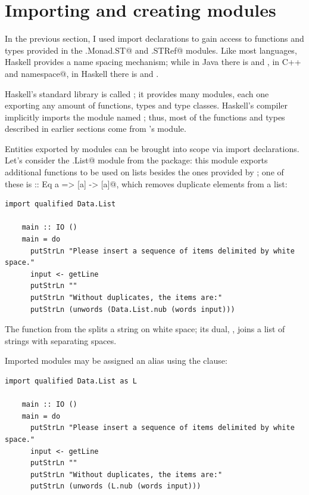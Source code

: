 \documentclass[UdineBachThesis,american,11pt]{PhdThesis}
\begin{document}
  \section{Importing and creating modules}

  In the previous section, I used import declarations to gain access to
  functions and types provided in the \lstinline@Control.Monad.ST@ and
  \lstinline@Data.STRef@ modules. Like most languages, Haskell provides a name
  spacing mechanism; while in Java there is \lstinline@package@ and
  \lstinline@import@, in C++ \lstinline@namespace@ and
  \lstinline@using namespace@, in Haskell there is \lstinline@module@ and
  \lstinline@import@.

  Haskell's standard library is called \lstinline@base@; it provides many
  modules, each one exporting any amount of functions, types and type classes.
  Haskell's compiler implicitly imports the module named \lstinline@Prelude@;
  thus, most of the functions and types described in earlier sections come from
  \lstinline@base@'s \lstinline@Prelude@ module.

  Entities exported by modules can be brought into scope via import
  declarations. Let's consider the \lstinline@Data.List@ module from the
  \lstinline@base@ package: this module exports additional functions to be used
  on lists besides the ones provided by \lstinline@Prelude@; one of these is
  \lstinline@nub :: Eq a => [a] -> [a]@, which removes duplicate elements from a
  list:

  \begin{lstlisting}[gobble=4,basicstyle=\ttfamily\small]
    import qualified Data.List

    main :: IO ()
    main = do
      putStrLn "Please insert a sequence of items delimited by white space."
      input <- getLine
      putStrLn ""
      putStrLn "Without duplicates, the items are:"
      putStrLn (unwords (Data.List.nub (words input)))
  \end{lstlisting}

  The function \lstinline@words@ from the \lstinline@Prelude@ splits a string on
  white space; its dual, \lstinline@unwords@, joins a list of strings with
  separating spaces.

  Imported modules may be assigned an alias using the \lstinline@as@ clause:

  \begin{lstlisting}[gobble=4,basicstyle=\ttfamily\small]
    import qualified Data.List as L

    main :: IO ()
    main = do
      putStrLn "Please insert a sequence of items delimited by white space."
      input <- getLine
      putStrLn ""
      putStrLn "Without duplicates, the items are:"
      putStrLn (unwords (L.nub (words input)))
  \end{lstlisting}
\end{document}
